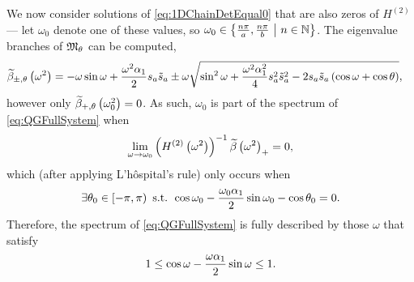 We now consider solutions of \eqref{eq:1DChainDetEqual0} that are also zeros of $H^{(2)}$ --- let $\omega_0$ denote one of these values, so $\omega_0\in\left\{ \frac{n\pi}{a}, \frac{n\pi}{b} \ \middle\vert \  n\in\mathbb{N}  \right\}$.
The eigenvalue branches of $\mathfrak{M}_{\theta}$ can be computed,
\begin{align*}
	\widetilde{\beta}_{\pm, \theta}\left( \omega^2 \right) &= -\omega\sin\omega + \frac{\omega^2\alpha_1}{2}s_a \tilde{s}_a \pm \omega\sqrt{ \sin^2\omega + \frac{\omega^2\alpha_1^2}{4}s_a^2 \tilde{s}_a^2 - 2s_a \tilde{s}_a\left( \cos\omega+\cos\theta \right) },
\end{align*}
however only $\widetilde{\beta}_{+, \theta}\left( \omega_0^2 \right)=0$.
As such, $\omega_0$ is part of the spectrum of \eqref{eq:QGFullSystem} when
\begin{align*}
	\lim_{\omega\rightarrow\omega_0}\left(  H^{(2)}\left( \omega^2 \right)  \right)^{-1}\widetilde{\beta}\left( \omega^2 \right)_{+} = 0,
\end{align*}
which (after applying L'h\^ospital's rule) only occurs when
\begin{align*}
	\exists\theta_0\in\left[-\pi,\pi\right) \text{ s.t. } \cos\omega_0 - \frac{\omega_0\alpha_1}{2}\sin\omega_0 - \cos\theta_0 = 0. 
\end{align*}
Therefore, the spectrum of \eqref{eq:QGFullSystem} is fully described by those $\omega$ that satisfy
\begin{align*}
	\-1 \leq \cos\omega - \frac{\omega\alpha_1}{2}\sin\omega \leq 1.
\end{align*}

